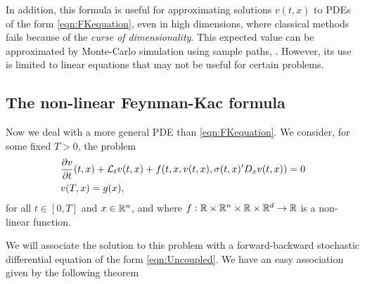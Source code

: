 In addition, this formula is useful for approximating solutions $v(t,x)$ to PDEs of the form \eqref{eqn:FKequation}, even in high dimensions, where classical methods fails because of the \textit{curse of dimensionality}. This expected value can be approximated by Monte-Carlo simulation using sample paths, . However, its use is limited to linear equations that may not be useful for certain problems.
\subsection{The non-linear Feynman-Kac formula}
Now we deal with a more general PDE than \eqref{eqn:FKequation}. We consider, for some fixed $T>0$, the problem 
\begin{equation}
	\label{eqn:FKNolineal}
	\begin{split}
		&\frac{\partial v}{\partial t}(t,x)+\mathcal{L}_t v(t,x)+f(t,x,v(t,x),\sigma(t,x)' D_x v(t,x))=0\\
		&v(T,x)=g(x),
	\end{split}
\end{equation}
for all $t\in[0,T]$ and $x\in\mathbb{R}^{n}$, and where $f:\mathbb{R}\times \mathbb{R}^n\times \mathbb{R} \times \mathbb{R}^d\to \mathbb{R}$ is a non-linear function.

We will associate the solution to this problem with a forward-backward stochastic differential equation of the form \eqref{eqn:Uncoupled}. We have an easy association given by the following theorem

